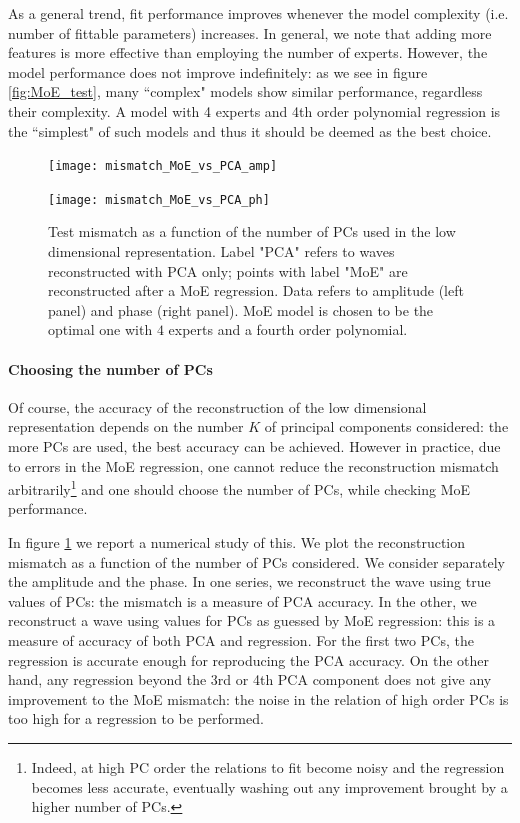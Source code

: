 As a general trend, fit performance improves whenever the model complexity (i.e. number of fittable parameters) increases.
In general, we note that adding more features is more effective than employing the number of experts.
However, the model performance does not improve indefinitely: as we see in figure \ref{fig:MoE_test}, many ``complex" models show similar performance, regardless their complexity.
A model with 4 experts and 4th order polynomial regression is the ``simplest" of such models and thus it should be deemed as the best choice.
\begin{figure}[!t]
	\centering 
    \begin{minipage}{.5\linewidth}
		\centering
	    \texttt{[image: mismatch\_MoE\_vs\_PCA\_amp]}
	\end{minipage}\hfill
    \begin{minipage}{.5\linewidth}
		\centering
	    \texttt{[image: mismatch\_MoE\_vs\_PCA\_ph]}
	\end{minipage}
	\caption{Test mismatch as a function of the number of PCs used in the low dimensional representation.
Label "PCA" refers to waves reconstructed with PCA only; points with label "MoE" are reconstructed after a MoE regression.
Data refers to amplitude (left panel) and phase (right panel).
MoE model is chosen to be the optimal one with $4$ experts and a fourth order polynomial.
}
	\label{fig:mismatch_MoE_vs_PCA}
\end{figure}
\paragraph{Choosing the number of PCs}
Of course, the accuracy of the reconstruction of the low dimensional representation depends on the number $K$ of principal components considered: the more PCs are used, the best accuracy can be achieved.
However in practice, due to errors in the MoE regression, one cannot reduce the reconstruction mismatch
arbitrarily\footnote{Indeed, at high PC order the relations to fit become noisy and the regression becomes less accurate, eventually washing out any improvement brought by a higher number of PCs.}
and one should choose the number of PCs, while checking MoE performance.

In figure \ref{fig:mismatch_MoE_vs_PCA} we report a numerical study of this. We plot the reconstruction mismatch as a function of the number of PCs considered. We consider separately the amplitude and the phase. In one series, we reconstruct the wave using true values of PCs: the mismatch is a measure of PCA accuracy. In the other, we reconstruct a wave using values for PCs as guessed by MoE regression: this is a measure of accuracy of both PCA and regression.
For the first two PCs, the regression is accurate enough for reproducing the PCA accuracy.
On the other hand, any regression beyond the 3rd or 4th PCA component does not give any improvement to the MoE mismatch: the noise in the relation of high order PCs is too high for a regression to be performed.


